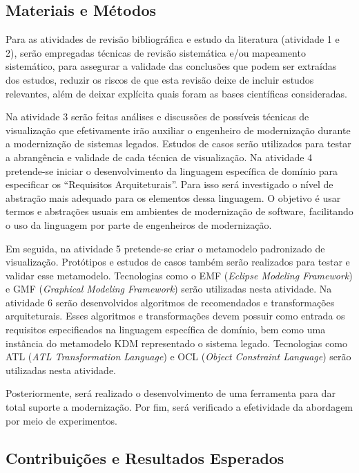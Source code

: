 \documentclass[12pt]{article}
\begin{document}
\subsection{Materiais e Métodos}

Para as atividades de revisão bibliográfica e estudo da literatura (atividade 1 e 2), serão empregadas técnicas de revisão sistemática e/ou mapeamento sistemático, para assegurar a validade das conclusões que podem ser extraídas dos estudos, reduzir os riscos de que esta revisão deixe de incluir estudos relevantes, além de deixar explícita quais foram as bases científicas consideradas.

Na atividade 3 serão feitas análises e discussões de possíveis técnicas de visualização que efetivamente irão auxiliar o engenheiro de modernização durante a modernização de sistemas legados. Estudos de casos serão utilizados para testar a abrangência e validade de cada técnica de visualização. Na atividade 4 pretende-se iniciar o desenvolvimento da linguagem específica de domínio para especificar os ``Requisitos Arquiteturais''. Para isso será investigado o nível de abstração mais adequado para os elementos dessa linguagem. O objetivo é usar termos e abstrações usuais em ambientes de modernização de software, facilitando o uso da linguagem por parte de engenheiros de modernização.

Em seguida, na atividade 5 pretende-se criar o metamodelo padronizado de visualização. Protótipos e estudos de casos também serão realizados para testar e validar esse metamodelo. Tecnologias como o EMF (\textit{Eclipse Modeling Framework}) e GMF (\textit{Graphical Modeling Framework}) serão utilizadas nesta atividade. Na atividade 6 serão desenvolvidos algoritmos de recomendados e transformações arquiteturais. Esses algoritmos e transformações devem possuir como entrada os requisitos especificados na linguagem específica de domínio, bem como uma instância do metamodelo KDM representado o sistema legado. Tecnologias como ATL (\textit{ATL Transformation Language}) e OCL (\textit{Object Constraint Language}) serão utilizadas nesta atividade. 

Posteriormente, será realizado o desenvolvimento de uma ferramenta para dar total suporte a modernização. Por fim, será verificado a efetividade da abordagem por meio de experimentos. 


\subsection{Contribuições e Resultados Esperados}\label{sec:resultados_esperados}
\end{document}
